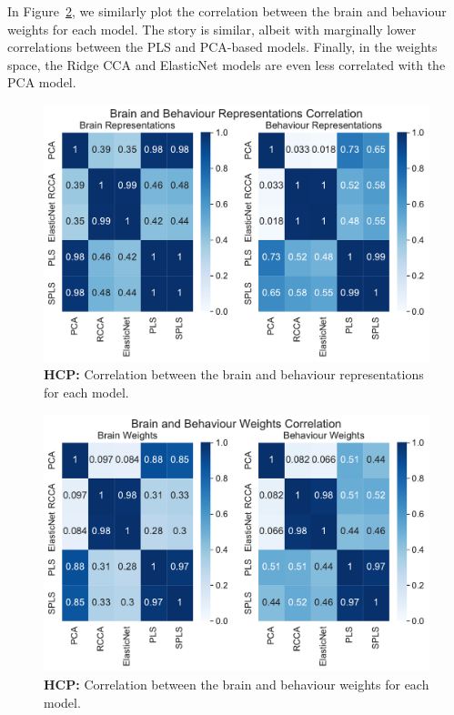 In Figure~\ref{fig:brain-behaviour-weights-sim}, we similarly plot the correlation between the brain and behaviour \gls{weights} for each model. 
The story is similar, albeit with marginally lower correlations between the PLS and PCA-based models. Finally, in the weights space, the Ridge CCA and ElasticNet models are even less correlated with the PCA model.

\begin{figure}
    \centering
    \includegraphics[width=0.9\linewidth]{figures/hcp/brain and behaviour scores correlation}
    \caption{\textbf{HCP:} Correlation between the brain and behaviour \gls{representations} for each model.}\label{fig:brain-behaviour-scores-sim}
\end{figure}

\begin{figure}
    \centering
    \includegraphics[width=0.8\linewidth]{figures/hcp/brain and behaviour weights correlation}
    \caption{\textbf{HCP:} Correlation between the brain and behaviour \gls{weights} for each model.}\label{fig:brain-behaviour-weights-sim}
\end{figure}


